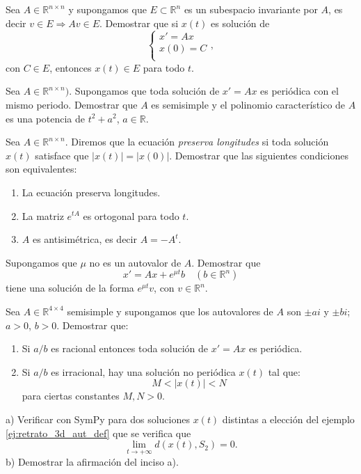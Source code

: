 \begin{ejercicio}{} Sea $A\in \mathbb{R}^{n\times n}$  y supongamos que
$E\subset\mathbb{R}^n$ es un subespacio  invariante por $A$, es decir $v\in E\Rightarrow Av\in E$. Demostrar
que si $x(t)$ es solución de
\[
  \left\{%
\begin{array}{ll}
     x'=Ax \\
    x(0)=C \\
\end{array}%
\right.,
\]
con $C\in E$, entonces $x(t)\in E$ para todo $t$.
\end{ejercicio}


\begin{ejercicio}{} Sea $A\in\mathbb{R}^{n\times n})$. Supongamos que toda solución de
$x'=Ax$ es periódica con el mismo periodo. Demostrar que $A$ es
semisimple y el polinomio característico de $A$ es una potencia
de $t^2+a^2$, $a\in\mathbb{R}$.
\end{ejercicio}


\begin{ejercicio}{} Sea $A\in\mathbb{R}^{n\times n}$. Diremos que la ecuación
\emph{preserva longitudes} si toda solución $x(t)$ satisface que
$|x(t)|=|x(0)|$. Demostrar que las siguientes condiciones son
equivalentes:
\begin{enumerate}
\item La ecuación preserva longitudes.
\item La matriz $e^{tA}$ es ortogonal para todo $t$.
\item $A$ es antisimétrica, es decir $A=-A^t$.
\end{enumerate}
\end{ejercicio}


\begin{ejercicio}{} Supongamos que $\mu$ no es un autovalor de $A$. Demostrar que
\[
    x'=Ax+e^{\mu t}b\quad (b\in\mathbb{R}^n)
\]
tiene una solución de la forma $e^{\mu t}v$, con
$v\in\mathbb{R}^n$.
\end{ejercicio}



\begin{ejercicio} Sea $A\in \mathbb{R}^{4\times 4} $ semisimple y
supongamos que los autovalores de $A$ son $\pm ai$ y $\pm bi$;
$a>0$, $b>0$.  Demostrar que:
\begin{enumerate}
    \item Si $a/b$ es racional entonces toda solución de $x'=Ax$
    es periódica.
    \item Si $a/b$ es irracional, hay una solución no periódica
    $x(t)$ tal que:
        \[
            M<|x(t)|<N
        \]
    para ciertas constantes $M,N>0$.
\end{enumerate}
\end{ejercicio}

 \begin{ejercicio} a) Verificar con SymPy para dos soluciones $x(t)$ distintas a elección del ejemplo \ref{ej:retrato_3d_aut_def} que se verifica que
 \[
  \lim_{t\to+\infty}d(x(t),S_2)=0.
 \]
b) Demostrar la afirmación del inciso a).
 \end{ejercicio}


 
 
 
 
 

